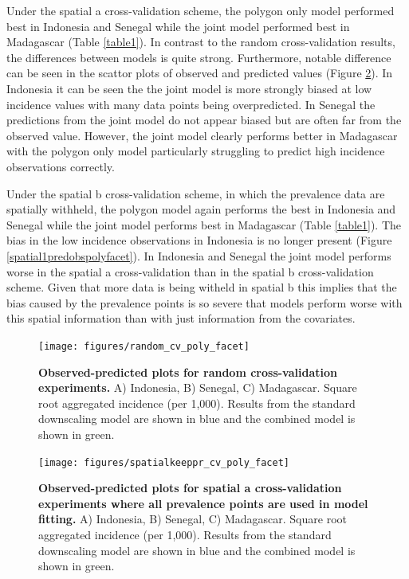 \documentclass[10pt,letterpaper]{article}
\begin{document}

Under the spatial a cross-validation scheme, the polygon only model performed best in Indonesia and Senegal while the joint model performed best in Madagascar (Table \ref{table1}).
In contrast to the random cross-validation results, the differences between models is quite strong.
Furthermore, notable difference can be seen in the scattor plots of observed and predicted values (Figure \ref{spatial2predobspolyfacet}).
In Indonesia it can be seen the the joint model is more strongly biased at low incidence values with many data points being overpredicted.
In Senegal the predictions from the joint model do not appear biased but are often far from the observed value.
However, the joint model clearly performs better in Madagascar with the polygon only model particularly struggling to predict high incidence observations correctly.



Under the spatial b cross-validation scheme, in which the prevalence data are spatially withheld, the polygon model again performs the best in Indonesia and Senegal while the joint model performs best in Madagascar (Table \ref{table1}).
The bias in the low incidence observations in Indonesia is no longer present (Figure \ref{spatial1predobspolyfacet}).
In Indonesia and Senegal the joint model performs worse in the spatial a cross-validation than in the spatial b cross-validation scheme.
Given that more data is being witheld in spatial b this implies that the bias caused by the prevalence points is so severe that models perform worse with this spatial information than with just information from the covariates.

\begin{figure}
\texttt{[image: figures/random\_cv\_poly\_facet]}  
\caption{{\bf Observed-predicted plots for random cross-validation experiments.}
A) Indonesia, B) Senegal, C) Madagascar. Square root aggregated incidence (per 1,000).
Results from the standard downscaling model are shown in blue and the combined model is shown in green.
}
\label{randompredobspolyfacet}
\end{figure}




\begin{figure}
\texttt{[image: figures/spatialkeeppr\_cv\_poly\_facet]}  
\caption{{\bf Observed-predicted plots for spatial a cross-validation experiments where all prevalence points are used in model fitting.}
A) Indonesia, B) Senegal, C) Madagascar. Square root aggregated incidence (per 1,000).
Results from the standard downscaling model are shown in blue and the combined model is shown in green.
}
\label{spatial2predobspolyfacet}
\end{figure}
\end{document}
